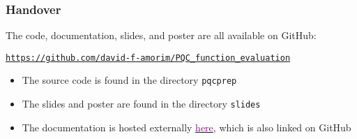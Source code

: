 \documentclass{beamer}
\begin{document}
\begin{frame}

\frametitle{Handover}

The code, documentation, slides, and poster are all available on GitHub:
\begin{center}
\vspace{0.6cm}
\href{https://github.com/david-f-amorim/PQC_function_evaluation}{\texttt{https://github.com/david-f-amorim/PQC\_function\_evaluation}}
\vspace{0.6cm}
\end{center}

\begin{itemize}
\item The source code is found in the directory \alert{\texttt{pqcprep}} 
\item The slides and poster are found in the directory \alert{\texttt{slides}}
\item The documentation is hosted externally  \href{https://david-f-amorim.github.io/PQC_function_evaluation/pqcprep.html}{\textcolor{purple}{here}}, which is also linked on GitHub
\end{itemize}

\end{frame}
\end{document}
